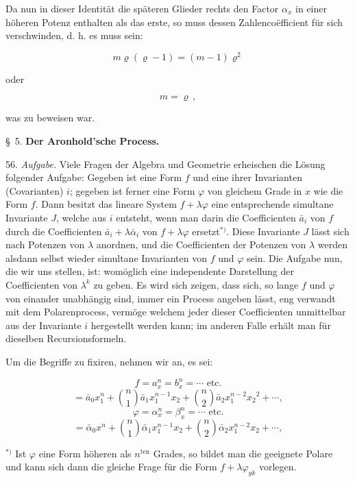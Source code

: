 Da nun in dieser Identität die späteren Glieder rechts den Factor $\alpha_x$ in einer höheren Potenz enthalten als das erste, so muss dessen Zahlencoëfficient für sich verschwinden, d. h. es muss sein:

\[
m\varrho(\varrho-1) = (m-1)\varrho^2
\]

oder

\[
m = \varrho\,,
\]

was zu beweisen war.

\begin{center}
\S~5. \textbf{Der Aronhold'sche Process.}
\end{center}

56. \textit{Aufgabe.} Viele Fragen der Algebra und Geometrie erheischen die Lösung folgender Aufgabe: Gegeben ist eine Form $f$ und eine ihrer Invarianten (Covarianten) $i$; gegeben ist ferner eine Form $\varphi$ von gleichem Grade in $x$ wie die Form $f$. Dann besitzt das lineare System $f + \lambda\varphi$ eine entsprechende simultane Invariante $J$, welche aus $i$ entsteht, wenn man darin die Coefficienten $\bar a_i$ von $f$ durch die Coefficienten $\bar a_i + \lambda\bar\alpha_i$ von $f + \lambda\varphi$ ersetzt$^{*)}$. Diese Invariante $J$ lässt sich nach Potenzen von $\lambda$ anordnen, und die Coefficienten der Potenzen von $\lambda$ werden alsdann selbst wieder simultane Invarianten von $f$ und $\varphi$ sein. Die Aufgabe nun, die wir uns stellen, ist: womöglich eine independente Darstellung der Coefficienten von $\lambda^k$ zu geben. Es wird sich zeigen, dass sich, so lange $f$ und $\varphi$ von einander unabhängig sind, immer ein Process angeben lässt, eng verwandt mit dem Polarenprocess, vermöge welchem jeder dieser Coefficienten unmittelbar aus der Invariante $i$ hergestellt werden kann; im anderen Falle erhält man für dieselben Recursionsformeln.

Um die Begriffe zu fixiren, nehmen wir an, es sei:

\[
f = a_x^n = b_x^n = \cdots \text{ etc.}
\]
\[
= \bar a_0 x_1^n + \binom{n}{1}\bar a_1 x_1^{n-1}x_2 + \binom{n}{2}\bar a_2 x_1^{n-2}x_2{}^2 + \cdots,
\]
\[
\varphi = \alpha_x^n = \beta_x^n = \cdots \text{ etc.}
\]
\[
= \bar\alpha_0 x^n + \binom{n}{1}\bar\alpha_1 x_1^{n-1}x_2 + \binom{n}{2}\bar\alpha_2 x_1^{n-2}x_2 + \cdots, %
\]

\medskip
\noindent{}$^{*)}$ Ist $\varphi$ eine Form höheren als $n^{\text{ten}}$ Grades, so bildet man die geeignete Polare und kann sich dann die gleiche Frage für die Form $f + \lambda\varphi_{yk}$ vorlegen.


